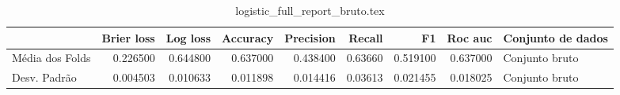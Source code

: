 \begin{table}
\centering
\caption{logistic_full_report_bruto.tex}
\label{logistic_full_report_bruto.tex}
\begin{tabular}{lrrrrrrrl}
\toprule
{} &  Brier  loss &  Log loss &  Accuracy  &  Precision  &  Recall  &       F1  &  Roc auc  & Conjunto de dados \\
\midrule
Média dos Folds &     0.226500 &  0.644800 &   0.637000 &    0.438400 &  0.63660 &  0.519100 &  0.637000 &    Conjunto bruto \\
Desv. Padrão    &     0.004503 &  0.010633 &   0.011898 &    0.014416 &  0.03613 &  0.021455 &  0.018025 &    Conjunto bruto \\
\bottomrule
\end{tabular}
\end{table}

